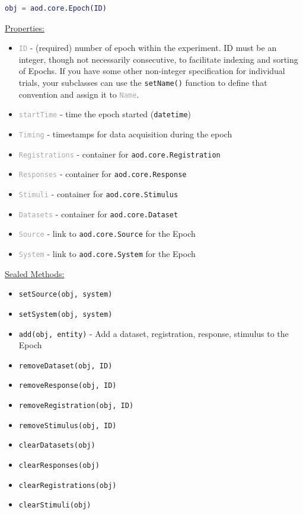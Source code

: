 \documentclass[10pt]{exam}
\newcommand\aodclass[1]{\textcolor{codeblue}{\texttt{#1}}}
\newcommand\aodprop[1]{\textcolor{darkgray}{\texttt{#1}}}
\newcommand\aodfcn[1]{\textcolor{darkteal}{\texttt{#1}}}
\newcommand\docheader[1]{\vspace{0.6ex}\noindent\underline{#1}\vspace{0.15ex}}
\begin{document}
		\begin{lstlisting}[language=matlab]
obj = aod.core.Epoch(ID)
		\end{lstlisting}
		\docheader{Properties:}
		\begin{itemize}
			\item \aodprop{ID} - (required) number of epoch within the experiment. ID must be an integer, though not necessarily consecutive, to facilitate indexing and sorting of Epochs. If you have some other non-integer specification for individual trials, your subclasses can use the \aodfcn{setName()} function to define that convention and assign it to \aodprop{Name}. 
			\item \aodprop{startTime} - time the epoch started (\aodclass{datetime})
			\item \aodprop{Timing} - timestamps for data acquisition during the epoch
			\item \aodprop{Registrations} - container for \aodclass{aod.core.Registration}
			\item \aodprop{Responses} - container for \aodclass{aod.core.Response}
			\item \aodprop{Stimuli} - container for \aodclass{aod.core.Stimulus}
			\item \aodprop{Datasets} - container for \aodclass{aod.core.Dataset}
			\item \aodprop{Source} - link to \aodclass{aod.core.Source} for the Epoch
			\item \aodprop{System} - link to \aodclass{aod.core.System} for the Epoch
		\end{itemize}	
		\docheader{Sealed Methods:}
		\begin{itemize}
			\item \aodfcn{setSource(obj, system)}
			\item \aodfcn{setSystem(obj, system)}
			\item \aodfcn{add(obj, entity)} - Add a dataset, registration, response, stimulus to the Epoch
			\item \aodfcn{removeDataset(obj, ID)}
			\item \aodfcn{removeResponse(obj, ID)}
			\item \aodfcn{removeRegistration(obj, ID)}
			\item \aodfcn{removeStimulus(obj, ID)}
			\item \aodfcn{clearDatasets(obj)}
			\item \aodfcn{clearResponses(obj)}
			\item \aodfcn{clearRegistrations(obj)}
			\item \aodfcn{clearStimuli(obj)}
		\end{itemize}	
\end{document}
